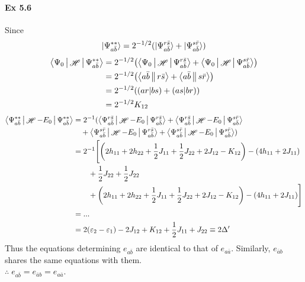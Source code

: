\documentclass[a4paper]{article}
\DeclareMathOperator{\sH}{\mathscr{H}}
\newcommand{\ex}[1]{\paragraph{Ex #1}}
\numberwithin{equation}{subsection}
\begin{document}
\ex{5.6}
Since
\begin{equation}\label{key}
\ket{\Psi_{a\bar{b}}^{**}} = 2^{-1/2} (\ket{\Psi_{a\bar{b}}^{r\bar{s}}} + \ket{\Psi_{a\bar{b}}^{s\bar{r}}})
\end{equation}
\begin{align}
\Braket{\Psi_0 | \sH | \Psi_{a\bar{b}}^{**}} &= 2^{-1/2}\qty(\Braket{\Psi_0 | \sH | \Psi_{a\bar{b}}^{r\bar{s}}} + \Braket{\Psi_0 | \sH | \Psi_{a\bar{b}}^{s\bar{r}}}) \notag\\
&= 2^{-1/2}\qty(\Braket{a\bar{b}||r\bar{s}} + \Braket{a\bar{b}||s\bar{r}} ) \notag\\
&= 2^{-1/2} \qty((ar|bs) + (as|br)) \notag\\
&= 2^{-1/2} K_{12}
\end{align}
\begin{align}
\Braket{\Psi_{a\bar{b}}^{**} | \sH - E_0 | \Psi_{a\bar{b}}^{**}} &= 2^{-1} (\Braket{\Psi_{a\bar{b}}^{r\bar{s}} | \sH - E_0 | \Psi_{a\bar{b}}^{r\bar{s}}} 
+ \Braket{\Psi_{a\bar{b}}^{r\bar{s}} | \sH - E_0 | \Psi_{a\bar{b}}^{s\bar{r}}} \notag\\
&{}\quad
+ \Braket{\Psi_{a\bar{b}}^{s\bar{r}} | \sH - E_0 | \Psi_{a\bar{b}}^{r\bar{s}}} 
+ \Braket{\Psi_{a\bar{b}}^{s\bar{r}} | \sH - E_0 | \Psi_{a\bar{b}}^{s\bar{r}}}) \notag\\
&= 2^{-1} \Bigg[ \qty(2h_{11} + 2h_{22} + \dfrac{1}{2}J_{11} + \dfrac{1}{2}J_{22} + 2J_{12} - K_{12}) - (4h_{11} + 2J_{11}) \notag\\
&{}\qquad + \dfrac{1}{2}J_{22} + \dfrac{1}{2}J_{22} \notag\\
&{}\qquad + \qty(2h_{11} + 2h_{22} + \dfrac{1}{2}J_{11} + \dfrac{1}{2}J_{22} + 2J_{12} - K_{12}) - (4h_{11} + 2J_{11})
\Bigg] \notag\\
&= ... \notag\\
&= 2(\varepsilon_2 - \varepsilon_1) - 2J_{12} + K_{12} + \dfrac{1}{2}J_{11} + J_{22} \equiv 2\Delta'
\end{align}
Thus the equations determining $ e_{a\bar{b}} $ are identical to that of $ e_{a\bar{a}} $. Similarly, $ e_{\bar{a}b} $ shares the same equations with them.\\
$ \therefore\; e_{a\bar{b}} = e_{\bar{a}b} = e_{a\bar{a}}$.
\end{document}
